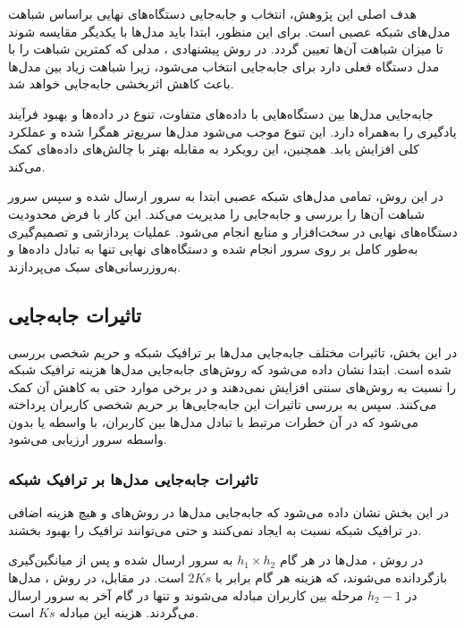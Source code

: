هدف اصلی این پژوهش، انتخاب و جابه‌جایی دستگاه‌های نهایی براساس شباهت مدل‌های شبکه عصبی است. برای این منظور، ابتدا باید مدل‌ها با یکدیگر مقایسه شوند تا میزان شباهت آن‌ها تعیین گردد. در روش پیشنهادی 
، 
مدلی که کمترین شباهت را با مدل دستگاه فعلی دارد برای جابه‌جایی انتخاب می‌شود، زیرا شباهت زیاد بین مدل‌ها باعث کاهش اثربخشی جابه‌جایی خواهد شد.

جابه‌جایی مدل‌ها بین دستگاه‌هایی با داده‌های متفاوت، تنوع در داده‌ها و بهبود فرآیند یادگیری را به‌همراه دارد. این تنوع موجب می‌شود مدل‌ها سریع‌تر همگرا شده و عملکرد کلی افزایش یابد. همچنین، این رویکرد به مقابله بهتر با چالش‌های داده‌های 
کمک می‌کند.

در این روش، تمامی مدل‌های شبکه عصبی ابتدا به سرور ارسال شده و سپس سرور شباهت آن‌ها را بررسی و جابه‌جایی را مدیریت می‌کند. این کار با فرض محدودیت دستگاه‌های نهایی در سخت‌افزار و منابع انجام می‌شود. عملیات پردازشی و تصمیم‌گیری به‌طور کامل بر روی سرور انجام شده و دستگاه‌های نهایی تنها به تبادل داده‌ها و به‌روزرسانی‌های سبک می‌پردازند.





\subsection{تاثیرات جابه‌جایی}

در این بخش، تاثیرات مختلف جابه‌جایی مدل‌ها بر ترافیک شبکه و حریم شخصی بررسی شده است. ابتدا نشان داده می‌شود که روش‌های جابه‌جایی مدل‌ها هزینه ترافیک شبکه را نسبت به روش‌های سنتی افزایش نمی‌دهند و در برخی موارد حتی به کاهش آن کمک می‌کنند. سپس به بررسی تاثیرات این جابه‌جایی‌ها بر حریم شخصی کاربران پرداخته می‌شود که در آن خطرات مرتبط با تبادل مدل‌ها بین کاربران، با واسطه یا بدون واسطه سرور ارزیابی می‌شود.

\subsubsection{تاثیرات جابه‌جایی مدل‌ها بر ترافیک شبکه}
در این بخش نشان داده می‌شود که جابه‌جایی مدل‌ها در روش‌های  
و  
هیچ هزینه اضافی در ترافیک شبکه نسبت به  
ایجاد نمی‌کنند و حتی می‌توانند ترافیک را بهبود بخشند.

در روش  
،  
مدل‌ها در هر گام  
\( h_1 \times h_2 \)  
به سرور ارسال شده و پس از میانگین‌گیری بازگردانده می‌شوند، که هزینه هر گام برابر با  
\( 2Ks \)  
است. در مقابل، در روش  
،  
مدل‌ها در \( h_2 - 1 \) مرحله بین کاربران مبادله می‌شوند و تنها در گام آخر به سرور ارسال می‌گردند. هزینه این مبادله  
\( Ks \)  
است.

